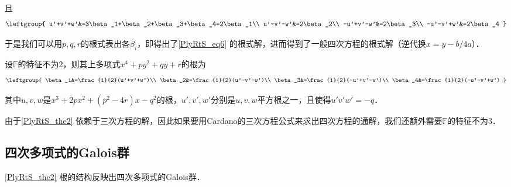 且
\begin{equation}
\leftgroup{
    u'+v'+w'&=3\beta_1+\beta_2+\beta_3+\beta_4=2\beta_1\\
    u'-v'-w'&=2\beta_2\\
    -u'+v'-w'&=2\beta_3\\
    -u'-v'+w'&=2\beta_4
}
\end{equation}

于是我们可以用$p, q, r$的根式表出各$\beta_i$，即得出了\autoref{PlyRtS_eq6} 的根式解，进而得到了一般四次方程的根式解（逆代换$x=y-b/4a$）．

\begin{theorem}{}\label{PlyRtS_the2}

设$\mathbb{F}$的特征不为$2$，则其上多项式$x^4+py^2+qy+r$的根为
\begin{equation}
\leftgroup{
    \beta_1&=\frac{1}{2}(u'+v'+w')\\
    \beta_2&=\frac{1}{2}(u'-v'-w')\\
    \beta_3&=\frac{1}{2}(-u'+v'-w')\\
    \beta_4&=\frac{1}{2}(-u'-v'+w')
}
\end{equation}

其中$u, v, w$是$x^3+2px^2+(p^2-4r)x-q^2$的根，$u', v', w'$分别是$u, v, w$平方根之一，且使得$u'v'w'=-q$．

\end{theorem}

由于\autoref{PlyRtS_the2} 依赖于三次方程的解，因此如果要用Cardano的三次方程公式来求出四次方程的通解，我们还额外需要$\mathbb{F}$的特征不为$3$．


\subsection{四次多项式的Galois群}


\autoref{PlyRtS_the2} 根的结构反映出四次多项式的Galois群．

